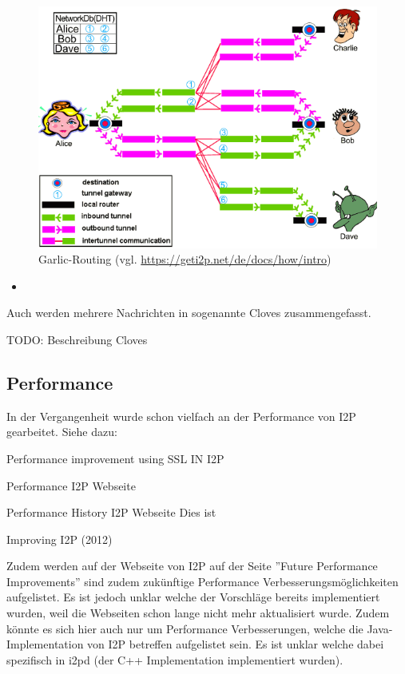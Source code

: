 \begin{figure}[H]
    \includegraphics[width=\textwidth]{img/i2prouting.png}
    \caption{Garlic-Routing (vgl. \url{https://geti2p.net/de/docs/how/intro})}
\end{figure}

\begin{itemize}
    \item
\end{itemize}

Auch werden mehrere Nachrichten in sogenannte Cloves zusammengefasst.

TODO: Beschreibung Cloves

\cite{de_boer_invisible_2019}

\cite{noauthor_intro_nodate}


\subsection{Performance}

In der Vergangenheit wurde schon vielfach an der Performance von I2P gearbeitet.
Siehe dazu:

Performance improvement using SSL IN I2P
\cite{vashi_performance_2015}

Performance I2P Webseite
\cite{noauthor_performance_nodate}

Performance History I2P Webseite
\cite{noauthor_performance_nodate-1}
Dies ist 

Improving I2P (2012)
\cite{timpanaro_improving_2012}

Zudem werden auf der Webseite von I2P auf der Seite ''Future Performance Improvements'' sind zudem zukünftige Performance Verbesserungsmöglichkeiten aufgelistet.
\cite{noauthor_future_nodate}
Es ist jedoch unklar welche der Vorschläge bereits implementiert wurden, weil die Webseiten schon lange nicht mehr aktualisiert wurde.
Zudem könnte es sich hier auch nur um Performance Verbesserungen, welche die Java-Implementation von I2P betreffen aufgelistet sein.
Es ist unklar welche dabei spezifisch in i2pd (der C++ Implementation implementiert wurden).

